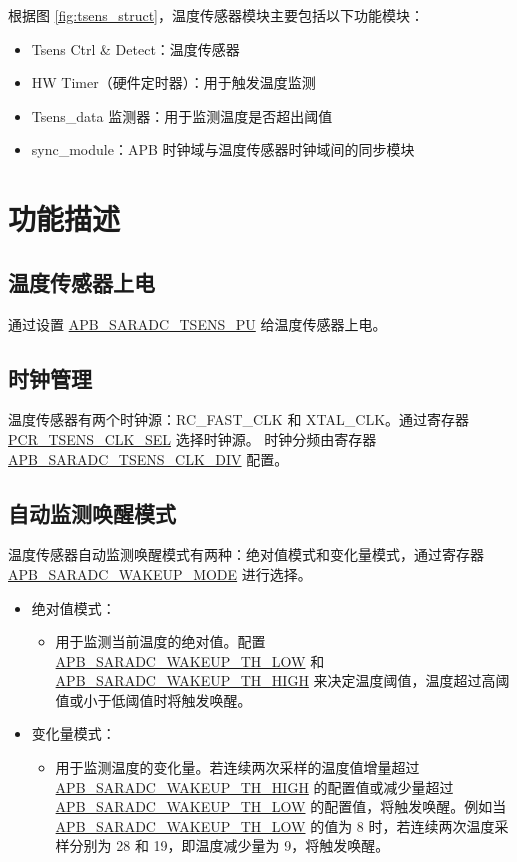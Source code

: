 \documentclass[main\_\_CN.tex]{subfiles}
\begin{document}
根据图 \ref{fig:tsens_struct}，温度传感器模块主要包括以下功能模块：

\begin{itemize}
\item Tsens Ctrl \& Detect：温度传感器
    \item HW Timer（硬件定时器）：用于触发温度监测
    \item Tsens\_data 监测器：用于监测温度是否超出阈值
    \item sync\_module：APB 时钟域与温度传感器时钟域间的同步模块
\end{itemize}
\section{功能描述}

\subsection{温度传感器上电}
通过设置 \hyperref[fielddesc:APBSARADCTSENSPU]{APB\_SARADC\_TSENS\_PU} 给温度传感器上电。

\subsection{时钟管理}
温度传感器有两个时钟源：RC\_FAST\_CLK 和 XTAL\_CLK。通过寄存器 \hyperref[fielddesc:PCRTSENSCLKSEL]{PCR\_TSENS\_CLK\_SEL} 选择时钟源。
时钟分频由寄存器 \hyperref[fielddesc:APBSARADCTSENSCLKDIV]{APB\_SARADC\_TSENS\_CLK\_DIV} 配置。

\subsection{自动监测唤醒模式}

温度传感器自动监测唤醒模式有两种：绝对值模式和变化量模式，通过寄存器 \hyperref[fielddesc:APBSARADCWAKEUPMODE]{APB\_SARADC\_WAKEUP\_MODE} 进行选择。

\begin{itemize}
    \item 绝对值模式：
        \begin{itemize}
            \item 用于监测当前温度的绝对值。配置 \hyperref[fielddesc:APBSARADCWAKEUPTHLOW]{APB\_SARADC\_WAKEUP\_TH\_LOW} 和 \hyperref[fielddesc:APBSARADCWAKEUPTHHIGH]{APB\_SARADC\_WAKEUP\_TH\_HIGH} 来决定温度阈值，温度超过高阈值或小于低阈值时将触发唤醒。
        \end{itemize}
    \item 变化量模式：
        \begin{itemize}
            \item 用于监测温度的变化量。若连续两次采样的温度值增量超过 \hyperref[fielddesc:APBSARADCWAKEUPTHHIGH]{APB\_SARADC\_WAKEUP\_TH\_HIGH} 的配置值或减少量超过 \hyperref[fielddesc:APBSARADCWAKEUPTHLOW]{APB\_SARADC\_WAKEUP\_TH\_LOW} 的配置值，将触发唤醒。例如当 \hyperref[fielddesc:APBSARADCWAKEUPTHLOW]{APB\_SARADC\_WAKEUP\_TH\_LOW} 的值为 8 时，若连续两次温度采样分别为 28 和 19，即温度减少量为 9，将触发唤醒。
        \end{itemize}
\end{itemize}
\end{document}
